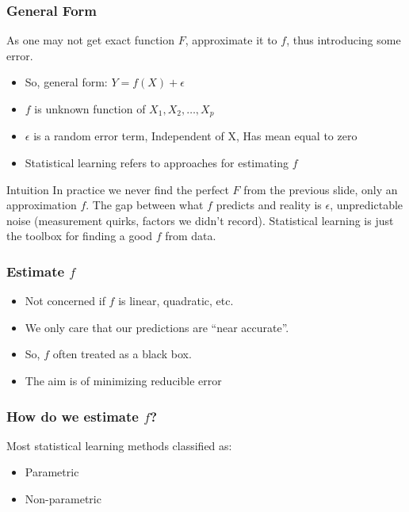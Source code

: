 \begin{frame}[fragile]\frametitle{General Form}
As one may not get exact function $F$, approximate it to $f$, thus introducing some error.
\begin{itemize}
\item So, general form: $Y = f(X) + \epsilon$
\item $f$ is unknown function of ${X_1, X_2, \ldots, X_p}$
\item  $\epsilon$ is a random error term, Independent of X, Has mean equal to zero
\item Statistical learning refers to approaches for estimating $f$
\end{itemize}
\begin{block}{Intuition}
In practice we never find the perfect $F$ from the previous slide, only an approximation $f$. The gap between what $f$ predicts and reality is $\epsilon$, unpredictable noise (measurement quirks, factors we didn't record). Statistical learning is just the toolbox for finding a good $f$ from data.
\end{block}
\end{frame}



\begin{frame}[fragile]\frametitle{Estimate $f$}
\begin{itemize}
\item Not concerned if $f$ is linear, quadratic, etc.
\item We only care that our predictions are ``near accurate''.
\item So, $f$ often treated as a black box. 
\item The aim is of minimizing reducible error
\end{itemize}
\end{frame}


\begin{frame}[fragile]\frametitle{How do we estimate $f$?}
Most statistical learning methods classified as:
	\begin{itemize}
	\item Parametric
	\item Non-parametric
	\end{itemize}
\end{frame}

